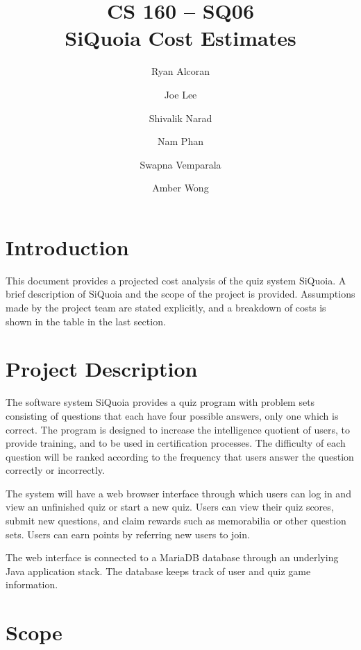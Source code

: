 \documentclass[12pt]{article}
\title{CS 160 -- SQ06 \\ SiQuoia Cost Estimates}
\author{Ryan Alcoran \and Joe Lee \and Shivalik Narad \and Nam Phan \and Swapna Vemparala \and Amber Wong}
\begin{document}
\begin{titlepage}
\maketitle
\end{titlepage}

\section{Introduction}
This document provides a projected cost analysis of the quiz system
SiQuoia. A brief description of SiQuoia and the scope of the project
is provided. Assumptions made by the project team are stated
explicitly, and a breakdown of costs is shown in the table in the last
section.

\section{Project Description}
The software system SiQuoia provides a quiz program with problem sets
consisting of questions that each have four possible answers, only one
which is correct. The program is designed to increase the intelligence
quotient of users, to provide training, and to be used in
certification processes. The difficulty of each question will be
ranked according to the frequency that users answer the question
correctly or incorrectly.

The system will have a web browser interface through which users can
log in and view an unfinished quiz or start a new quiz. Users can view
their quiz scores, submit new questions, and claim rewards such as
memorabilia or other question sets. Users can earn points by referring
new users to join.

The web interface is connected to a MariaDB database through an
underlying Java application stack. The database keeps track of user
and quiz game information.

\section{Scope}
\end{document}
